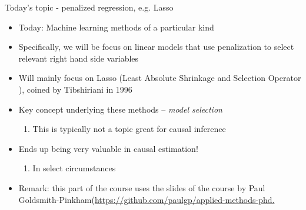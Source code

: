 \begin{frame}[allowframebreaks]{Today's topic - penalized regression, e.g. Lasso}
    \begin{itemize}
        \item Today: Machine learning methods of a particular kind
        \item Specifically, we will be focus on linear models that use
          penalization to select relevant right hand side variables
        \item Will mainly focus on Lasso (Least Absolute Shrinkage and
          Selection Operator ), coined by Tibshiriani in 1996
        \item Key concept underlying these methods -- \emph{model selection}
          \begin{enumerate}[-]
          \item This is typically not a topic great for causal inference
          \end{enumerate}
        \item Ends up being very valuable in causal estimation!
          \begin{enumerate}[-]
          \item In select circumstances
          \end{enumerate}
           \item Remark: this part of the course uses the slides of the course by Paul Goldsmith-Pinkham(\url{https://github.com/paulgp/applied-methods-phd.}
    \end{itemize}
     \end{frame}
